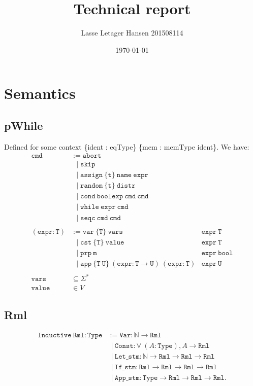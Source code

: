 \documentclass[11pt, leqno]{article}
\author{Lasse Letager Hansen 201508114}
\date{\today}
\title{Technical report}
\newcommand{\set}[1]{\{#1\}}
\begin{document}
\maketitle

\section{Semantics}
\subsection{pWhile}
Defined for some context \set{ident : eqType} \set{mem : memType ident}. We have:
\begin{align*}
  \mathtt{cmd} &:= \mathtt{abort} \\
               &~~\mid \mathtt{skip} \\
               &~~\mid \mathtt{assign~\set{t}~name~expr} \\
               &~~\mid \mathtt{random~\set{t}~distr} \\
               &~~\mid \mathtt{cond~boolexp~cmd~cmd} \\
               &~~\mid \mathtt{while~expr~cmd} \\
               &~~\mid \mathtt{seqc~cmd~cmd}
  \\ \\
  \mathtt{(expr : T)} &:= \mathtt{var~\set{T}~vars} & \mathtt{expr~T} \\
               &~~\mid \mathtt{cst~\set{T}~value} & \mathtt{expr~T} \\
               &~~\mid \mathtt{prp~m} & \mathtt{expr~bool} \\
               &~~\mid \mathtt{app~\set{T~U}~(expr : T \rightarrow U)~(expr : T)} & \mathtt{expr~U}
  \\ \\
  \mathtt{vars} &\subseteq \Sigma^* \\
  \mathtt{value} &\in V
\end{align*}

\subsection{Rml}

\begin{align*}
\mathtt{Inductive~Rml : Type} &:= \mathtt{Var} : \mathbb{N} \rightarrow \mathtt{Rml} \\
&~~|~\mathtt{Const} : \forall~(A : \mathtt{Type}), A \rightarrow \mathtt{Rml} \\
&~~|~\mathtt{Let\_stm} : \mathbb{N} \rightarrow \mathtt{Rml} \rightarrow \mathtt{Rml} \rightarrow \mathtt{Rml} \\
&~~|~\mathtt{If\_stm} : \mathtt{Rml} \rightarrow \mathtt{Rml} \rightarrow \mathtt{Rml} \rightarrow \mathtt{Rml} \\
&~~|~\mathtt{App\_stm} : \mathtt{Type} \rightarrow \mathtt{Rml} \rightarrow \mathtt{Rml} \rightarrow \mathtt{Rml}. \\
\end{align*}
\end{document}
